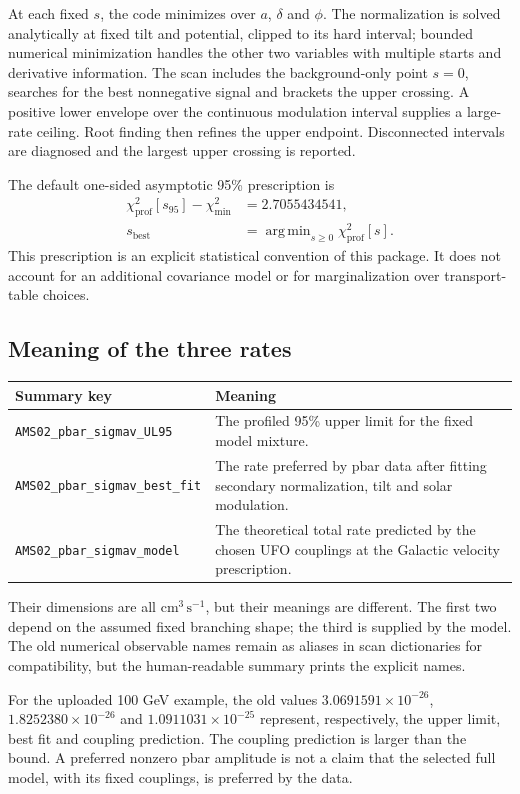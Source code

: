 \documentclass[11pt,a4paper]{article}
\begin{document}
At each fixed $s$, the code minimizes over $a$, $\delta$ and $\phi$. The normalization is solved analytically at fixed tilt and potential, clipped to its hard interval; bounded numerical minimization handles the other two variables with multiple starts and derivative information. The scan includes the background-only point $s=0$, searches for the best nonnegative signal and brackets the upper crossing. A positive lower envelope over the continuous modulation interval supplies a large-rate ceiling. Root finding then refines the upper endpoint. Disconnected intervals are diagnosed and the largest upper crossing is reported.

The default one-sided asymptotic 95\% prescription is
\begin{align}
\chi^2_{\mathrm{prof}}[s_{95}]-\chi^2_{\mathrm{min}} &= 2.7055434541,\\
s_{\mathrm{best}} &= \mathop{\mathrm{arg\,min}}_{s\geq0}\chi^2_{\mathrm{prof}}[s].
\end{align}
This prescription is an explicit statistical convention of this package. It does not account for an additional covariance model or for marginalization over transport-table choices.

\subsection{Meaning of the three rates}
\begin{longtable}{p{.44\linewidth}p{.48\linewidth}}
\toprule Summary key & Meaning\\\midrule\endhead
\texttt{AMS02\_pbar\_sigmav\_UL95} & The profiled 95\% upper limit for the fixed model mixture.\\
\texttt{AMS02\_pbar\_sigmav\_best\_fit} & The rate preferred by pbar data after fitting secondary normalization, tilt and solar modulation.\\
\texttt{AMS02\_pbar\_sigmav\_model} & The theoretical total rate predicted by the chosen UFO couplings at the Galactic velocity prescription.\\\bottomrule
\end{longtable}
Their dimensions are all $\mathrm{cm}^3\,\mathrm{s}^{-1}$, but their meanings are different. The first two depend on the assumed fixed branching shape; the third is supplied by the model. The old numerical observable names remain as aliases in scan dictionaries for compatibility, but the human-readable summary prints the explicit names.

For the uploaded 100 GeV example, the old values $3.0691591\times10^{-26}$, $1.8252380\times10^{-26}$ and $1.0911031\times10^{-25}$ represent, respectively, the upper limit, best fit and coupling prediction. The coupling prediction is larger than the bound. A preferred nonzero pbar amplitude is not a claim that the selected full model, with its fixed couplings, is preferred by the data.
\end{document}
